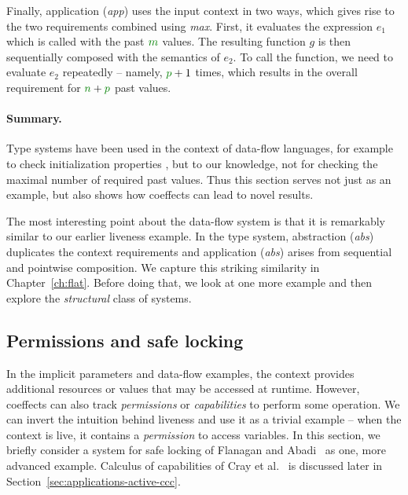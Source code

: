 Finally, application (\emph{app}) uses the input context in two ways, which gives rise to the
two requirements combined using \emph{max}. First, it evaluates the expression $e_1$ which is 
called with the past $\cclrd{m}$ values. The resulting function $g$ is then sequentially composed
with the semantics of $e_2$. To call the function, we need to evaluate $e_2$ repeatedly -- namely,
$\cclrd{p}+1$ times, which results in the overall requirement for $\cclrd{n}+\cclrd{p}$ past values.

\paragraph{Summary.}
Type systems have been used in the context of data-flow languages, for example to check
initialization properties \cite{app-dataflow-init}, but to our knowledge, not for checking
the maximal number of required past values. Thus this section serves not just as an example, 
but also shows how coeffects can lead to novel results.

The most interesting point about the data-flow system is that it is remarkably similar to our
earlier liveness example. In the type system, abstraction (\emph{abs}) duplicates the context
requirements and application (\emph{abs}) arises from sequential and pointwise composition.
We capture this striking similarity in Chapter~\ref{ch:flat}. Before doing that, we look at one
more example and then explore the \emph{structural} class of systems.


\subsection{Permissions and safe locking}
In the implicit parameters and data-flow examples, the context provides additional resources or 
values that may be accessed at runtime. However, coeffects can also track \emph{permissions} or 
\emph{capabilities} to perform some operation. We can invert the intuition behind liveness and 
use it as a trivial example -- when the context is live, it contains a \emph{permission} to access 
variables. In this section, we briefly consider a system for safe locking of Flanagan and 
Abadi~\cite{app-safe-locking} as one, more advanced example. Calculus of capabilities of 
Cray et al.~\cite{app-capabilities} is discussed later in Section~\ref{sec:applications-active-ccc}.

